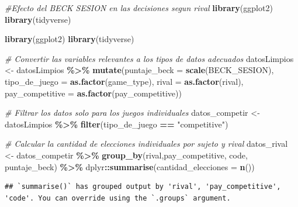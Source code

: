 \documentclass[
]{article}
\newenvironment{Shaded}{\begin{snugshade}}{\end{snugshade}}
\newcommand{\AttributeTok}[1]{\textcolor[rgb]{0.13,0.29,0.53}{#1}}
\newcommand{\CommentTok}[1]{\textcolor[rgb]{0.56,0.35,0.01}{\textit{#1}}}
\newcommand{\FunctionTok}[1]{\textcolor[rgb]{0.13,0.29,0.53}{\textbf{#1}}}
\newcommand{\NormalTok}[1]{#1}
\newcommand{\OtherTok}[1]{\textcolor[rgb]{0.56,0.35,0.01}{#1}}
\newcommand{\SpecialCharTok}[1]{\textcolor[rgb]{0.81,0.36,0.00}{\textbf{#1}}}
\newcommand{\StringTok}[1]{\textcolor[rgb]{0.31,0.60,0.02}{#1}}
\begin{document}
\begin{Shaded}
\begin{Highlighting}[]
\CommentTok{\#Efecto del BECK SESION en las decisiones segun rival}
\FunctionTok{library}\NormalTok{(ggplot2)}
\FunctionTok{library}\NormalTok{(tidyverse)}

\FunctionTok{library}\NormalTok{(ggplot2)}
\FunctionTok{library}\NormalTok{(tidyverse)}


\CommentTok{\# Convertir las variables relevantes a los tipos de datos adecuados}
\NormalTok{datosLimpios }\OtherTok{\textless{}{-}}\NormalTok{ datosLimpios }\SpecialCharTok{\%\textgreater{}\%}
  \FunctionTok{mutate}\NormalTok{(}\AttributeTok{puntaje\_beck =} \FunctionTok{scale}\NormalTok{(BECK\_SESION), }\AttributeTok{tipo\_de\_juego =} \FunctionTok{as.factor}\NormalTok{(game\_type), }\AttributeTok{rival =} \FunctionTok{as.factor}\NormalTok{(rival), }\AttributeTok{pay\_competitive =} \FunctionTok{as.factor}\NormalTok{(pay\_competitive))}

\CommentTok{\# Filtrar los datos solo para los juegos individuales}
\NormalTok{datos\_competir }\OtherTok{\textless{}{-}}\NormalTok{ datosLimpios }\SpecialCharTok{\%\textgreater{}\%}
  \FunctionTok{filter}\NormalTok{(tipo\_de\_juego }\SpecialCharTok{==} \StringTok{"competitive"}\NormalTok{)}

\CommentTok{\# Calcular la cantidad de elecciones individuales por sujeto y rival}
\NormalTok{datos\_rival }\OtherTok{\textless{}{-}}\NormalTok{ datos\_competir }\SpecialCharTok{\%\textgreater{}\%}
  \FunctionTok{group\_by}\NormalTok{(rival,pay\_competitive, code, puntaje\_beck) }\SpecialCharTok{\%\textgreater{}\%}
\NormalTok{  dplyr}\SpecialCharTok{::}\FunctionTok{summarise}\NormalTok{(}\AttributeTok{cantidad\_elecciones =} \FunctionTok{n}\NormalTok{())}
\end{Highlighting}
\end{Shaded}

\begin{verbatim}
## `summarise()` has grouped output by 'rival', 'pay_competitive', 'code'. You can override using the `.groups` argument.
\end{verbatim}
\end{document}
